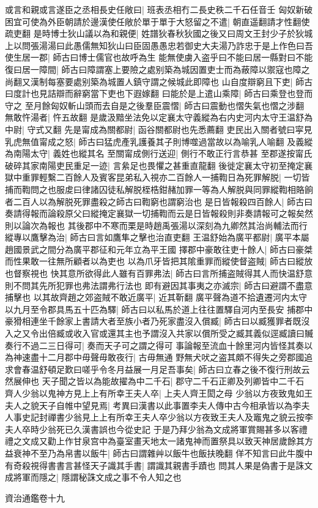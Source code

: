 或言和親或言遂臣之丞相長史任敞曰|{
	班表丞相冇二長史秩二千石任音壬}
匈奴新破困宜可使為外臣朝請於邊漢使任敞於單于單于大怒留之不遣|{
	朝直遥翻請才性翻使疏吏翻}
是時博士狄山議以為和親便|{
	姓譜狄春秋狄國之後又曰周文王封少子於狄城}
上以問張湯湯曰此愚儒無知狄山曰臣固愚愚忠若御史大夫湯乃詐忠于是上作色曰吾使生居一郡|{
	師古曰博士儒官也故呼為生}
能無使虜入盗乎曰不能曰居一縣對曰不能復曰居一障間|{
	師古曰障謂塞上要險之處别築為城因置吏士而為蔽障以禦寇也障之尚翻又漢制每塞要處别築為城置人鎮守謂之候城此即障也}
山自度辯窮且下吏|{
	師古曰度計也見詰辯而辭窮當下吏也下遐嫁翻}
曰能於是上遣山乘障|{
	師古曰乘登也登而守之}
至月餘匈奴斬山頭而去自是之後羣臣震慴|{
	師古曰震動也慴失氣也慴之涉翻}
無敢忤湯者|{
	忤五故翻}
是歲汲黯坐法免以定襄太守義縱為右内史河内太守王温舒為中尉|{
	守式又翻}
先是甯成為關都尉|{
	函谷關都尉也先悉薦翻}
吏民出入關者號曰寜見乳虎無值甯成之怒|{
	師古曰猛虎產乳護養其子則博噬過當故以為喻乳人喻翻}
及義縱為南陽太守|{
	義姓也縱其名}
至關甯成側行送迎|{
	側行不敢正行言恭甚}
至郡遂按甯氏破碎其家南陽吏民重足一迹|{
	言絫足也畏懼之甚重直龍翻}
後徙定襄太守初至掩定襄獄中重罪輕繫二百餘人及賓客昆弟私入視亦二百餘人一捕鞫日為死罪解脱|{
	一切皆捕而鞫問之也服䖍曰律諸囚徒私解脱桎梏鉗赭加罪一等為人解脱與同罪縱鞫相賂餉者二百人以為解脱死罪盡殺之師古曰鞫窮也謂窮治也}
是日皆報殺四百餘人|{
	師古曰奏請得報而論殺原父曰縱掩定襄獄一切捕鞫而云是日皆報殺則非奏請報可之報矣然則以論次為報也}
其後郡中不寒而栗是時趙禹張湯以深刻為九卿然其治尚輔法而行縱專以鷹擊為治|{
	師古曰言如鷹隼之擊也治直吏翻}
王温舒始為廣平都尉|{
	廣平本屬趙國景武之間分為廣平郡征和元年立為平王國}
擇郡中豪敢往吏十餘人|{
	師古曰豪桀而性果敢一往無所顧者以為吏也}
以為爪牙皆把其隂重罪而縱使督盗賊|{
	師古曰縱放也督察視也}
快其意所欲得此人雖有百罪弗法|{
	師古曰言所捕盗賊得其人而快温舒意則不問其先所犯罪也弗法謂弗行法也}
即有避因其事夷之亦滅宗|{
	師古曰避謂不盡意捕擊也}
以其故齊趙之郊盗賊不敢近廣平|{
	近其靳翻}
廣平聲為道不拾遺遷河内太守以九月至令郡具馬五十匹為驛|{
	師古曰以私馬於道上往往置驛自河内至長安}
捕郡中豪猾相連坐千餘家上書請大者至族小者乃死家盡沒入償臧|{
	師古曰以臧獲罪者既沒入之又令出倍臧或收入官或還其主也予謂沒入共家以償所受之臧其義似逕臧讀曰贓}
奏行不過二三日得可|{
	奏而天子可之謂之得可}
事論報至流血十餘里河内皆怪其奏以為神速盡十二月郡中毋聲毋敢夜行|{
	古毋無通}
野無犬吠之盗其頗不得失之旁郡國追求會春温舒頓足歎曰嗟乎令冬月益展一月足吾事矣|{
	師古曰立春之後不復行刑故云然展伸也}
天子聞之皆以為能故擢為中二千石|{
	郡守二千石正卿及列卿皆中二千石}
齊人少翁以鬼神方見上上有所幸王夫人卒|{
	上夫人齊王閎之母}
少翁以方夜致鬼如王夫人之貌天子自帷中望見焉|{
	考異曰漢書以此事置李夫人傳中古今相承皆以為李夫人事史記封禪書少翁見上上有所幸王夫人卒少翁以方夜致王夫人及竈鬼之貌云按李夫人卒時少翁死已久漢書誤也今從史記}
于是乃拜少翁為文成將軍賞賜甚多以客禮禮之文成又勸上作甘泉宫中為臺室畫天地太一諸鬼神而置祭具以致天神居歲餘其方益衰神不至乃為帛書以飯牛|{
	師古曰謂雜艸以飯牛也飯扶晚翻}
佯不知言曰此牛腹中有奇殺視得書書言甚怪天子識其手書|{
	謂識其親書手蹟也}
問其人果是偽書于是誅文成將軍而隱之|{
	隱謂秘誅文成之事不令人知之也}


資治通鑑卷十九
